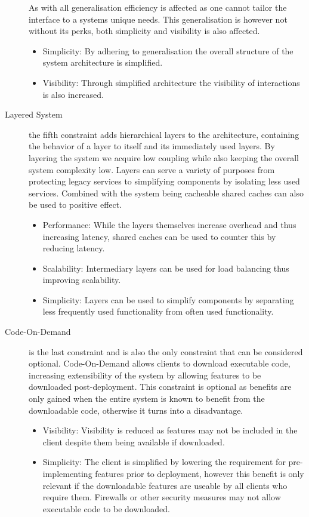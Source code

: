 \begin{description}
    As with all generalisation efficiency is affected as one cannot tailor the interface to a systems unique needs.
    This generalisation is however not without its perks, both simplicity and visibility is also affected.
    \begin{itemize}
        \item Simplicity: By adhering to generalisation the overall structure of the system architecture is simplified.
        \item Visibility: Through simplified architecture the visibility of interactions is also increased.
    \end{itemize}
    \item [Layered System] the fifth constraint adds hierarchical layers to the architecture, containing the behavior of a layer to itself and its immediately used layers.
    By layering the system we acquire low coupling while also keeping the overall system complexity low.
    Layers can serve a variety of purposes from protecting legacy services to simplifying components by isolating less used services.
    Combined with the system being cacheable shared caches can also be used to positive effect.
    \begin{itemize}
        \item Performance: While the layers themselves increase overhead and thus increasing latency, shared caches can be used to counter this by reducing latency.
        \item Scalability: Intermediary layers can be used for load balancing thus improving scalability.
        \item Simplicity: Layers can be used to simplify components by separating less frequently used functionality from often used functionality.
    \end{itemize} 
    \item [Code-On-Demand] is the last constraint and is also the only constraint that can be considered optional.
    Code-On-Demand allows clients to download executable code, increasing extensibility of the system by allowing features to be downloaded post-deployment.
    This constraint is optional as benefits are only gained when the entire system is known to benefit from the downloadable code, otherwise it turns into a disadvantage.
    \begin{itemize}
        \item Visibility: Visibility is reduced as features may not be included in the client despite them being available if downloaded.
        \item Simplicity: The client is simplified by lowering the requirement for pre-implementing features prior to deployment, however this benefit is only relevant if the downloadable features are useable by all clients who require them.
        Firewalls or other security measures may not allow executable code to be downloaded.
    \end{itemize} 
\end{description}